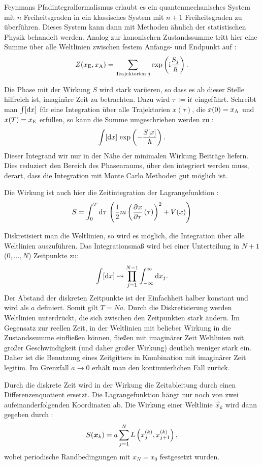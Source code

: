 Feynmans Pfadintegralformalismus erlaubt es ein quantenmechanisches System mit
$n$ Freiheitsgraden in ein klassisches System mit $n+1$ Freiheitsgraden zu
überführen. Dieses System kann dann mit Methoden ähnlich der statistischen
Physik behandelt werden. Analog zur kanonischen Zustandssumme tritt hier eine
Summe über alle Weltlinien zwischen festem Anfangs- und Endpunkt auf
\parencite[(2.7)]{Creutz/Statistical_Approach_QM}:
\[
    Z(x_\text E, x_\text A) = \sum_{\text{Trajektorien $j$}} \exp\del{ \iup
    \frac{S_j}{\hbar}}.
\]

Die Phase mit der Wirkung $S$ wird stark variieren, so dass es ab dieser Stelle
hilfreich ist, imaginäre Zeit zu betrachten. Dazu wird $\tau := \mathrm i t$
eingeführt. Schreibt man $\int [\dif x]$ für eine Integration über alle
Trajektorien $x(\tau)$, die $x(0) = x_\text A$ und $x(T) = x_\text E$ erfüllen,
so kann die Summe umgeschrieben werden zu
\parencite[(2.1)]{Creutz/Statistical_Approach_QM}:
\[
    \int [\dif x] \, \exp\del{-\frac{S[x]}\hbar}.
\]
Dieser Integrand wir nur in der Nähe der minimalen Wirkung Beiträge liefern.
Dies reduziert den Bereich des Phasenraums, über den integriert werden muss,
derart, dass die Integration mit Monte Carlo Methoden gut möglich ist.

Die Wirkung ist auch hier die Zeitintegration der Lagrangefunktion
\parencite[(2.5)]{Creutz/Statistical_Approach_QM}:
\[
    S = \int_0^T \dif \tau \, \del{\frac 12 m \del{\dpd x\tau(\tau)}^2 + V(x)}
\]

Diskretisiert man die Weltlinien, so wird es möglich, die Integration über alle
Weltlinien auszuführen. Das Integrationsmaß wird bei einer Unterteilung in
$N+1$ ($0, \ldots, N$)
Zeitpunkte zu:
\[
    \int [\dif x] \leadsto \prod_{j = 1}^{N-1} \int_{-\infty}^\infty \dif x_j.
\]
Der Abstand der diskreten Zeitpunkte ist der Einfachheit halber konstant und
wird als $a$ definiert. Somit gilt $T = Na$. Durch die Diskretisierung werden
Weltlinien unterdrückt, die sich zwischen den Zeitpunkten stark ändern. Im
Gegensatz zur reellen Zeit, in der Weltlinien mit belieber Wirkung in die
Zustandssumme einfließen können, fließen mit imaginärer Zeit Weltlinien mit
großer Geschwindigkeit (und daher großer Wirkung) deutlich weniger stark ein.
Daher ist die Benutzung eines Zeitgitters in Kombination mit imaginärer Zeit
legitim. Im Grenzfall $a \to 0$ erhält man den kontinuierlichen Fall zurück.

Durch die diskrete Zeit wird in der Wirkung die Zeitableitung durch einen
Differenzenquotient ersetzt. Die Lagrangefunktion hängt nur noch von zwei
aufeinanderfolgenden Koordinaten ab. Die Wirkung einer Weltlinie $\vec x_k$
wird dann gegeben durch
\parencite[(3.2)]{Creutz/Statistical_Approach_QM}:
\[
    S(\vec x_k) = a \sum_{j = 1}^N L\del{x_j^{(k)}, x_{j+1}^{(k)}},
\]
wobei periodische Randbedingungen mit $x_{N} = x_0$ festgesetzt wurden.


